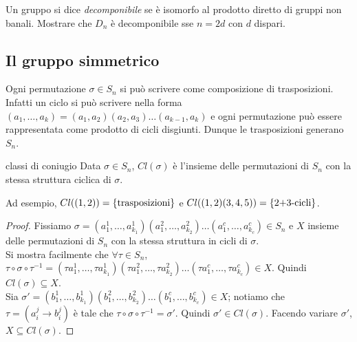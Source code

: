 \begin{exercise}
    Un gruppo si dice \emph{decomponibile} se è isomorfo al prodotto diretto di gruppi non banali. Mostrare che $D_n$ è decomponibile sse $n = 2d$ con $d$ dispari.
\end{exercise}

\subsection{Il gruppo simmetrico}

Ogni permutazione $\sigma \in S_n$ si può scrivere come composizione di trasposizioni. Infatti un ciclo si può scrivere nella forma $(a_1, \dots, a_k) = (a_1, a_2)(a_2,a_3)\dots(a_{k-1},a_k)$ e ogni permutazione può essere rappresentata come prodotto di cicli disgiunti. Dunque le trasposizioni generano $S_n$.

\begin{proposition}{classi di coniugio}
    Data $\sigma \in S_n$, $Cl(\sigma)$ è l'insieme delle permutazioni di $S_n$ con la stessa struttura ciclica di $\sigma$.
    
    Ad esempio, $Cl((1,2)) = \left\{ \text{trasposizioni} \right\}$ e $Cl((1,2)(3,4,5)) = \left\{ \text{2+3-cicli} \right\}$.
\end{proposition}
\begin{proof}
    Fissiamo $\sigma = (a^1_1, \dots, a^1_{k_1})(a^2_1, \dots, a^2_{k_2}) \dots (a^c_1, \dots, a^c_{k_c})\in S_n$ e $X$ insieme delle permutazioni di $S_n$ con la stessa struttura in cicli di $\sigma$. \\
    Si mostra facilmente che $\forall \tau \in S_n$, $\tau\circ\sigma\circ\tau^{-1} = (\tau{a^1_1}, \dots, \tau{a^1_{k_1}})(\tau{a^2_1}, \dots, \tau{a^2_{k_2}}) \dots (\tau{a^c_1}, \dots, \tau{a^c_{k_c}}) \in X$. Quindi $Cl(\sigma)\subseteq X$. \\
    Sia $\sigma ' = (b^1_1, \dots, b^1_{k_1})(b^2_1, \dots, b^2_{k_2}) \dots (b^c_1, \dots, b^c_{k_c}) \in X$; notiamo che $\tau = (a_i^j \to b_i^j)$ è tale che $\tau\circ \sigma\circ \tau^{-1} = \sigma'$. Quindi $\sigma' \in Cl(\sigma)$. Facendo variare $\sigma'$, $X \subseteq Cl(\sigma)$. 
\end{proof}

